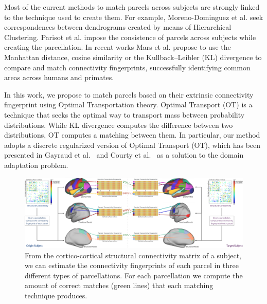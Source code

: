 Most of the current methods to match parcels across subjects are strongly
linked to the technique used to create them. For example,
Moreno-Dominguez et al. \cite{Moreno-Dominguez2014} seek correspondences between
dendrograms created by means of Hierarchical Clustering. 
Parisot et al. \cite{Paristot2015} impose the consistence of parcels across
subjects while creating the parcellation. In recent works Mars et al. propose
to use the Manhattan distance, cosine similarity \cite{Mars2016} or the
Kullback–Leibler (KL) divergence \cite{Mars2018} to compare and match connectivity
fingerprints, successfully identifying common areas across humans and primates.

In this work, we propose to match parcels based on their extrinsic connectivity
fingerprint using Optimal Transportation theory. Optimal Transport (OT) is a
technique that seeks the optimal way to transport mass between probability
distributions. While KL divergence computes the difference between two
distributions, OT computes a matching between them. In particular, our method
adopts a discrete regularized version of Optimal Transport (OT), which has been
presented in Gayraud et al.~\cite{nathalie} and Courty et al.~\cite{remi} as a
solution to the domain adaptation problem.

\begin{figure}[t!]
\centering
\includegraphics[width=1\textwidth]{6.matching/img/method}
\caption{From the cortico-cortical structural connectivity matrix of a subject, we can estimate the connectivity fingerprints of each parcel in three different types of parcellations. For each parcellation we compute the amount of correct matches (green lines) that each matching technique produces.}
\label{fig:method}
\end{figure}

